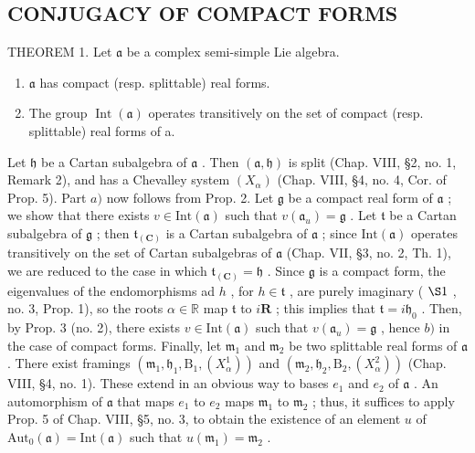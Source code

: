 \subsection{CONJUGACY OF COMPACT FORMS}

THEOREM 1. Let \(\mathfrak{a}\) be a complex semi-simple Lie algebra.

\begin{enumerate}
\def\labelenumi{\alph{enumi})}
\item
  \(\mathfrak{a}\) has compact (resp. splittable) real forms.
\item
  The group \(\operatorname{Int}(\mathfrak{a})\) operates transitively on the set of compact (resp. splittable) real forms of a.
\end{enumerate}

Let \(\mathfrak{h}\) be a Cartan subalgebra of \(\mathfrak{a}\) . Then \((\mathfrak{a},\mathfrak{h})\) is split (Chap. VIII, §2, no. 1, Remark 2), and has a Chevalley system \((X_{\alpha})\) (Chap. VIII, §4, no. 4, Cor. of Prop. 5). Part \(a)\) now follows from Prop. 2. Let \(\mathfrak{g}\) be a compact real form of \(\mathfrak{a}\) ; we show that there exists \(v\in\mathrm{Int}(\mathfrak{a})\) such that \(v(\mathfrak{a}_{u})=\mathfrak{g}\) . Let \(\mathfrak{t}\) be a Cartan subalgebra of \(\mathfrak{g}\) ; then \(\mathfrak{t}_{(\mathbf{C})}\) is a Cartan subalgebra of \(\mathfrak{a}\) ; since \(\mathrm{Int}(\mathfrak{a})\) operates transitively on the set of Cartan subalgebras of \(\mathfrak{a}\) (Chap. VII, §3, no. 2, Th. 1), we are reduced to the case in which \(\mathfrak{t}_{(\mathbf{C})}=\mathfrak{h}\) . Since \(\mathfrak{g}\) is a compact form, the eigenvalues of the endomorphisms ad \(h\) , for \(h\in\mathfrak{t}\) , are purely imaginary ( \(\S1\) , no. 3, Prop. 1), so the roots \(\alpha\in\mathbb{R}\) map \(\mathfrak{t}\) to \(i\mathbf{R}\) ; this implies that \(\mathfrak{t}=i\mathfrak{h}_{0}\) . Then, by Prop. 3 (no. 2), there exists \(v\in\mathrm{Int}(\mathfrak{a})\) such that \(v(\mathfrak{a}_{u})=\mathfrak{g}\) , hence \(b)\) in the case of compact forms. Finally, let \(\mathfrak{m}_{1}\) and \(\mathfrak{m}_{2}\) be two splittable real forms of \(\mathfrak{a}\) . There exist framings \((\mathfrak{m}_{1},\mathfrak{h}_{1},\mathrm{B}_{1},(X_{\alpha}^{1}))\) and \((\mathfrak{m}_{2},\mathfrak{h}_{2},\mathrm{B}_{2},(X_{\alpha}^{2}))\) (Chap. VIII, §4, no. 1). These extend in an obvious way to bases \(e_{1}\) and \(e_{2}\) of \(\mathfrak{a}\) . An automorphism of \(\mathfrak{a}\) that maps \(e_{1}\) to \(e_{2}\) maps \(\mathfrak{m}_{1}\) to \(\mathfrak{m}_{2}\) ; thus, it suffices to apply Prop. 5 of Chap. VIII, §5, no. 3, to obtain the existence of an element \(u\) of \(\mathrm{Aut}_{0}(\mathfrak{a})=\mathrm{Int}(\mathfrak{a})\) such that \(u(\mathfrak{m}_{1})=\mathfrak{m}_{2}\) .

